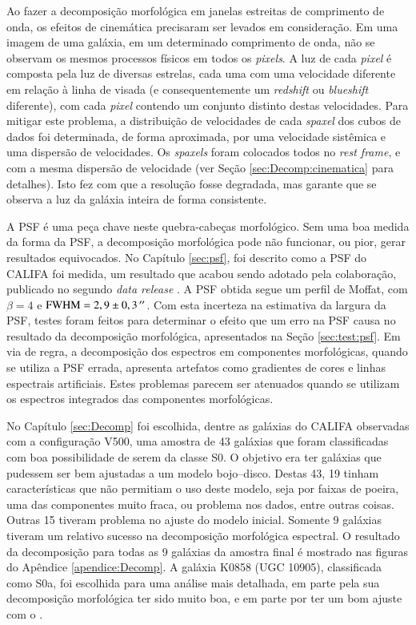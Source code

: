Ao fazer a decomposição morfológica em janelas estreitas de comprimento de onda,
os efeitos de cinemática precisaram ser levados em consideração. Em uma imagem
de uma galáxia, em um determinado comprimento de onda, não se observam os mesmos
processos físicos em todos os {\em pixels}. A luz de cada {\em pixel} é composta
pela luz de diversas estrelas, cada uma com uma velocidade diferente em relação
à linha de visada (e consequentemente um {\em redshift} ou {\em blueshift}
diferente), com cada {\em pixel} contendo um conjunto distinto destas
velocidades. Para mitigar este problema, a distribuição de velocidades de cada
{\em spaxel} dos cubos de dados foi determinada, de forma aproximada, por uma
velocidade sistêmica e uma dispersão de velocidades. Os {\em spaxels} foram
colocados todos no {\em rest frame}, e com a mesma dispersão de velocidade (ver
Seção \ref{sec:Decomp:cinematica} para detalhes). Isto fez com que a resolução
fosse degradada, mas garante que se observa a luz da galáxia inteira de forma
consistente.

A PSF é uma peça chave neste quebra-cabeças morfológico. Sem uma boa medida da
forma da PSF, a decomposição morfológica pode não funcionar, ou pior, gerar
resultados equivocados. No Capítulo \ref{sec:psf}, foi descrito como  a PSF do
CALIFA foi medida, um resultado que acabou sendo adotado pela colaboração,
publicado no segundo {\em data release} \citep{GarciaBenito2015}. A PSF obtida
segue um perfil de Moffat, com $\beta = 4$ e $\mathrm{FWHM}=2,9 \pm 0,3\,^{\prime\prime}$.
Com esta incerteza na estimativa da largura da PSF, testes foram feitos para
determinar o efeito que um erro na PSF causa no resultado da decomposição
morfológica, apresentados na Seção \ref{sec:test:psf}. Em via de regra, a
decomposição dos espectros em componentes morfológicas, quando se utiliza a PSF
errada, apresenta artefatos como gradientes de cores e linhas espectrais
artificiais. Estes problemas parecem ser atenuados quando se utilizam os
espectros integrados das componentes morfológicas.

No Capítulo \ref{sec:Decomp} foi escolhida, dentre as galáxias do CALIFA
observadas com a configuração V500, uma amostra de 43 galáxias que foram
classificadas com boa possibilidade de serem da classe S0. O objetivo era ter
galáxias que pudessem ser bem ajustadas a um modelo bojo--disco. Destas 43, 19
tinham características que não permitiam o uso deste modelo, seja por faixas de
poeira, uma das componentes muito fraca, ou problema nos dados, entre outras
coisas. Outras 15 tiveram problema no ajuste do modelo inicial. Somente 9
galáxias tiveram um relativo sucesso na decomposição morfológica espectral. O
resultado da decomposição para todas as 9 galáxias da amostra final é mostrado
nas figuras do Apêndice \ref{apendice:Decomp}. A galáxia K0858 (UGC 10905),
classificada como S0a, foi escolhida para uma análise mais detalhada, em parte
pela sua decomposição morfológica ter sido muito boa, e em parte por ter um bom
ajuste com o \starlight.

